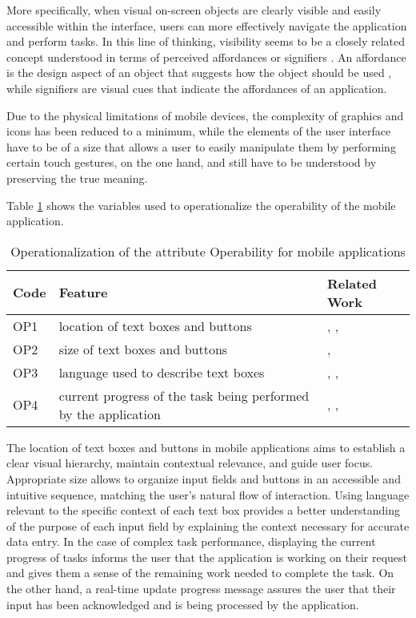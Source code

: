\documentclass[preprint,12pt]{elsarticle}
\begin{document}
More specifically, when visual on-screen objects are clearly visible and easily accessible within the interface, users can more effectively navigate the application and perform tasks. In this line of thinking, visibility seems to be a closely related concept understood in terms of perceived affordances or signifiers \cite{norman2010gestural}. An affordance is the design aspect of an object that suggests how the object should be used \cite{mcgrenere2000affordances}, while signifiers are visual cues that indicate the affordances of an application.

Due to the physical limitations of mobile devices, the complexity of graphics and icons has been reduced to a minimum, while the elements of the user interface have to be of a size that allows a user to easily manipulate them by performing certain touch gestures, on the one hand, and still have to be understood by preserving the true meaning. 

Table \ref{tab:oper-operability} shows the variables used to operationalize the operability of the mobile application.

\begin{table}[h]
\caption{Operationalization of the attribute Operability for mobile applications}
\label{tab:oper-operability}
\footnotesize
\begin{tabular}{|l|p{9cm}|p{2.7cm}|}
\hline
\textbf{Code}  & \textbf{Feature}  & \textbf{Related Work} \\ \hline
OP1 & location of text boxes and buttons & \cite{kangas2005applying}, \cite{nguyen2015reverse}, \cite{natarajan2018p2a} \\ \hline
OP2 & size of text boxes and buttons  & \cite{kangas2005applying}, \cite{deniz2019comparison}       \\ \hline
OP3 & language used to describe text boxes  &  \cite{kangas2005applying}, \cite{kim2022speak}, \cite{wen2023droidbot}   \\ \hline
OP4 & current progress of the task being performed by the application  & \cite{mansar2012usability},  \cite{moroyoqui2022smartasko}, \cite{nakagawa2022implementation}  \\ \hline
\end{tabular}
\end{table}

The location of text boxes and buttons in mobile applications aims to establish a clear visual hierarchy, maintain contextual relevance, and guide user focus. Appropriate size allows to organize input fields and buttons in an accessible and intuitive sequence, matching the user's natural flow of interaction. 
Using language relevant to the specific context of each text box provides a better understanding of the purpose of each input field by explaining the context necessary for accurate data entry. 
In the case of complex task performance, displaying the current progress of tasks informs the user that the application is working on their request and gives them a sense of the remaining work needed to complete the task. On the other hand, a real-time update progress message assures the user that their input has been acknowledged and is being processed by the application.
\end{document}
